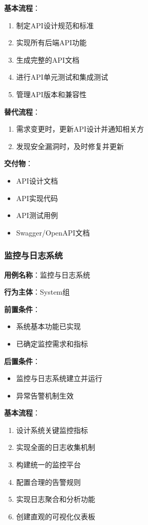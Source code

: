 \documentclass[a4paper,12pt]{article}
\begin{document}
\textbf{基本流程}：
\begin{enumerate}
  \item 制定API设计规范和标准
  \item 实现所有后端API功能
  \item 生成完整的API文档
  \item 进行API单元测试和集成测试
  \item 管理API版本和兼容性
\end{enumerate}

\textbf{替代流程}：
\begin{enumerate}
  \item 需求变更时，更新API设计并通知相关方
  \item 发现安全漏洞时，及时修复并更新
\end{enumerate}

\textbf{交付物}：
\begin{itemize}
  \item API设计文档
  \item API实现代码
  \item API测试用例
  \item Swagger/OpenAPI文档
\end{itemize}

\subsubsection{监控与日志系统}

\textbf{用例名称}：监控与日志系统

\textbf{行为主体}：System组

\textbf{前置条件}：
\begin{itemize}
  \item 系统基本功能已实现
  \item 已确定监控需求和指标
\end{itemize}

\textbf{后置条件}：
\begin{itemize}
  \item 监控与日志系统建立并运行
  \item 异常告警机制生效
\end{itemize}

\textbf{基本流程}：
\begin{enumerate}
  \item 设计系统关键监控指标
  \item 实现全面的日志收集机制
  \item 构建统一的监控平台
  \item 配置合理的告警规则
  \item 实现日志聚合和分析功能
  \item 创建直观的可视化仪表板
\end{enumerate}
\end{document}
